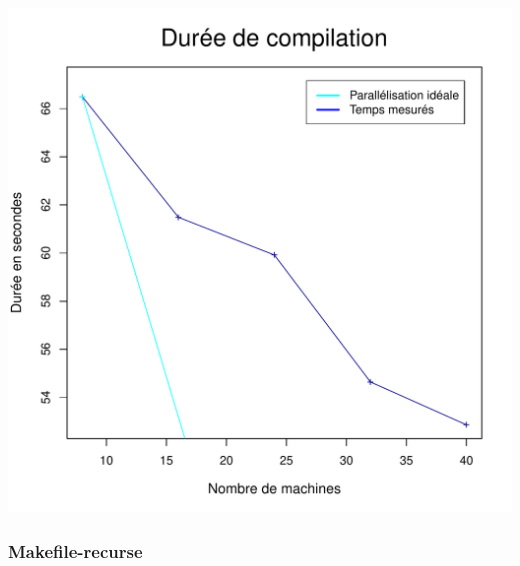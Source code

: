 \documentclass[a4paper, 11pt, titlepage]{article}
\begin{document}
\begin{center}
    \includegraphics[scale=0.55]{res/sujet_makefiles_blender_249_Makefile_nth1.pdf}
\end{center}


\subsubsection {Makefile-recurse}
\end{document}

